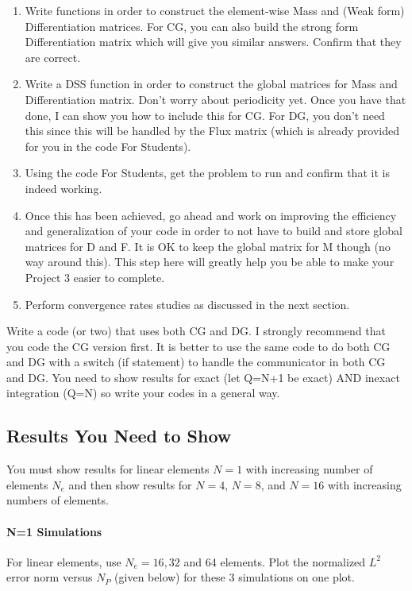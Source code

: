 \documentclass[10pt]{article}
\begin{document}
\begin{enumerate}
\item Write functions in order to construct the element-wise Mass and (Weak form) Differentiation matrices.  For CG, you can also build the strong form Differentiation matrix which will give you similar answers. Confirm that they are correct.
\item Write a DSS function in order to construct the global matrices for Mass and Differentiation matrix.  Don't worry about periodicity yet.  Once you have that done, I can show you how to include this for CG. For DG, you don't need this since this will be handled by the Flux matrix (which is already provided for you in the code For Students).
\item Using the code For Students, get the problem to run and confirm that it is indeed working.
\item Once this has been achieved, go ahead and work on improving the efficiency and generalization of your code in order to not have to build and store global matrices for D and F.  It is OK to keep the global matrix for M though (no way around this). This step here will greatly help you be able to make your Project 3 easier to complete.
\item Perform convergence rates studies as discussed in the next section.
\end{enumerate}
Write a code (or two) that uses both CG and DG.  I strongly recommend
that you code the CG version first. It is better to use the same code
to do both CG and DG with a switch (if statement) to handle the
communicator in both CG and DG.
You need to show results for exact (let Q=N+1 be exact) AND inexact integration (Q=N) so write your codes in a general way. 

\subsection{Results You Need to Show}
You must show results for linear elements $N=1$ with increasing number of elements $N_e$ and then show results for 
$N=4$, $N=8$, and $N=16$ with increasing numbers of elements.

\paragraph{N=1 Simulations}
For linear elements, use $N_e=16, 32$ and 64 elements.
Plot the normalized $L^2$ error norm versus $N_P$ (given below) for these 3 simulations on one plot.
\end{document}
